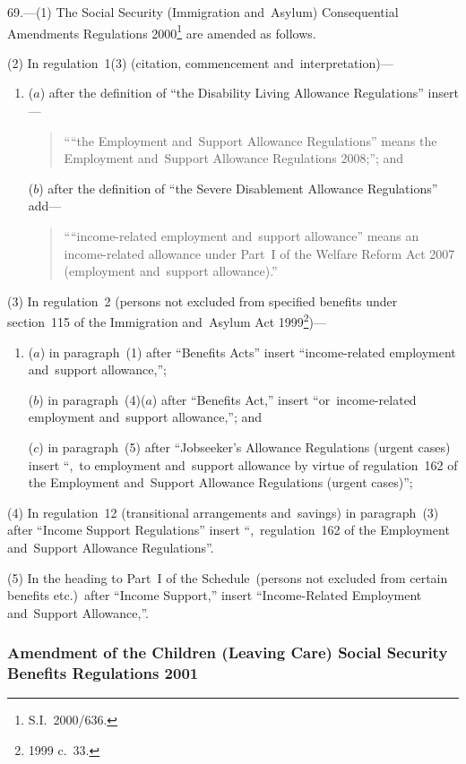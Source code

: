 \documentclass[12pt,a4paper]{article}
\begin{document}
69.---(1)  The Social Security (Immigration and~Asylum) Consequential Amendments Regulations 2000\footnote{S.I.~2000/636.} are amended as follows.

(2) In regulation~1(3) (citation, commencement and~interpretation)—
\begin{enumerate}\item[]
($a$) after the definition of “the Disability Living Allowance Regulations” insert—
\begin{quotation}
““the Employment and~Support Allowance Regulations” means the Employment and~Support Allowance Regulations 2008;”; and
\end{quotation}

($b$) after the definition of “the Severe Disablement Allowance Regulations” add—
\begin{quotation}\sloppy
““income-related employment and~support allowance” means an income-related allowance under Part~I of the Welfare Reform Act 2007 (employment and~support allowance).”
\end{quotation}
\end{enumerate}

(3) In regulation~2 (persons not excluded from specified benefits under section~115 of the Immigration and~Asylum Act 1999\footnote{1999 c.~33.})—
\begin{enumerate}\item[]
($a$) in paragraph~(1) after “Benefits Acts” insert “income-related employment and~support allowance,”;

($b$) in paragraph~(4)($a$)  after “Benefits Act,” insert “or~income-related employment and~support allowance,”; and

($c$) in paragraph~(5) after “Jobseeker’s Allowance Regulations (urgent cases) insert “,~to employment and~support allowance by virtue of regulation~162 of the Employment and~Support Allowance Regulations (urgent cases)”;
\end{enumerate}

(4) In regulation~12 (transitional arrangements and~savings) in paragraph~(3) after “Income Support Regulations” insert “,~regulation~162 of the Employment and~Support Allowance Regulations”.

(5) In the heading to Part~I of the Schedule~(persons not excluded from certain benefits etc.)\ after “Income Support,” insert “Income-Related Employment and~Support Allowance,”.

\subsubsection[70. Amendment of the Children (Leaving Care) Social Security Benefits Regulations 2001]{Amendment of the Children (Leaving Care) Social Security Benefits Regulations 2001}
\end{document}
